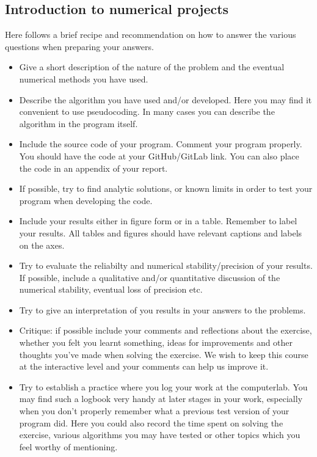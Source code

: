 \documentclass[%
oneside,                 %
final,                   %
10pt]{article}
\begin{document}
\noindent
\subsection*{Introduction to numerical projects}

Here follows a brief recipe and recommendation on how to answer the various questions when preparing your answers. 

\begin{itemize}
  \item Give a short description of the nature of the problem and the eventual  numerical methods you have used.

  \item Describe the algorithm you have used and/or developed. Here you may find it convenient to use pseudocoding. In many cases you can describe the algorithm in the program itself.

  \item Include the source code of your program. Comment your program properly. You should have the code at your GitHub/GitLab link. You can also place the code in an appendix of your report.

  \item If possible, try to find analytic solutions, or known limits in order to test your program when developing the code.

  \item Include your results either in figure form or in a table. Remember to        label your results. All tables and figures should have relevant captions        and labels on the axes.

  \item Try to evaluate the reliabilty and numerical stability/precision of your results. If possible, include a qualitative and/or quantitative discussion of the numerical stability, eventual loss of precision etc.

  \item Try to give an interpretation of you results in your answers to  the problems.

  \item Critique: if possible include your comments and reflections about the  exercise, whether you felt you learnt something, ideas for improvements and  other thoughts you've made when solving the exercise. We wish to keep this course at the interactive level and your comments can help us improve it.

  \item Try to establish a practice where you log your work at the  computerlab. You may find such a logbook very handy at later stages in your work, especially when you don't properly remember  what a previous test version  of your program did. Here you could also record  the time spent on solving the exercise, various algorithms you may have tested or other topics which you feel worthy of mentioning.
\end{itemize}
\end{document}

